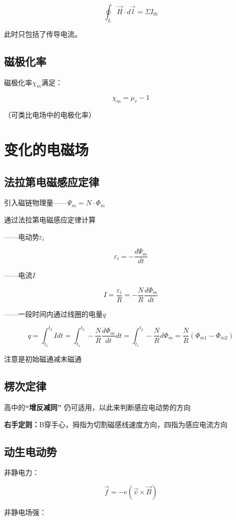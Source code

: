 \documentclass{ctexart}
\begin{document}
$$\oint_{L}\vec{H}\cdot d\vec{l}=\Sigma I_{0i}$$

此时只包括了传导电流。

\subsection{磁极化率}

磁极化率$\chi_m$满足：

$$\chi_m=\mu_r-1$$

（可类比电场中的电极化率）

\section{变化的电磁场}

\subsection{法拉第电磁感应定律}

引入磁链物理量——$\Psi_m=N·\Phi_m$

通过法拉第电磁感应定律计算

——电动势$\varepsilon_i$

$$\varepsilon_i=-\frac{d\Psi_m}{dt}$$

——电流$I$

$$I=\frac{\varepsilon_i}{R}=-\frac{N}{R}\frac{d\Phi_m}{dt}$$

——一段时间内通过线圈的电量$q$

$$q=\int_{t_1}^{t_2}I dt=\int_{t_1}^{t_2}-\frac{N}{R}\frac{d\Phi_m}{dt} dt
=\int_{t_1}^{t_2}-\frac{N}{R}{d\Phi_m}=\frac{N}{R}(\Phi_{m1}-\Phi_{m2})$$

注意是初始磁通减末磁通

\subsection{楞次定律}

高中的\textbf{“增反减同”} 仍可适用，以此来判断感应电动势的方向

\textbf{右手定则：}B穿手心，拇指为切割磁感线速度方向，四指为感应电流方向

\subsection{动生电动势}

非静电力：

$$\vec{f}=-e(\vec{v}\times \vec{B})$$

非静电场强：
\end{document}
